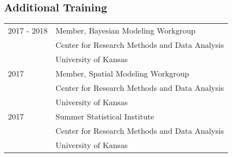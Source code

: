 \documentclass[margin,line,pifont,palatino,courier]{res}
\newenvironment{list1}{
  \begin{list}{\ding{113}}{%
      \setlength{\itemsep}{0in}
      \setlength{\parsep}{0in} \setlength{\parskip}{0in}
      \setlength{\topsep}{0in} \setlength{\partopsep}{0in}
      \setlength{\leftmargin}{0.17in}}}{\end{list}}
\begin{document}
\begin{resume}



\section{\sc Additional Training}

\begin{tabular}{@{}p{0.8in}p{4in}}
  2017 - 2018   & Member, Bayesian Modeling Workgroup\\
            & Center for Research Methods and Data Analysis\\
            & University of Kansas\\
  2017      & Member, Spatial Modeling Workgroup\\
            & Center for Research Methods and Data Analysis\\
            & University of Kansas\\
  2017      & Summer Statistical Institute\\
            & Center for Research Methods and Data Analysis\\
            & University of Kansas\\
\end{tabular}




\end{resume}
\end{document}

